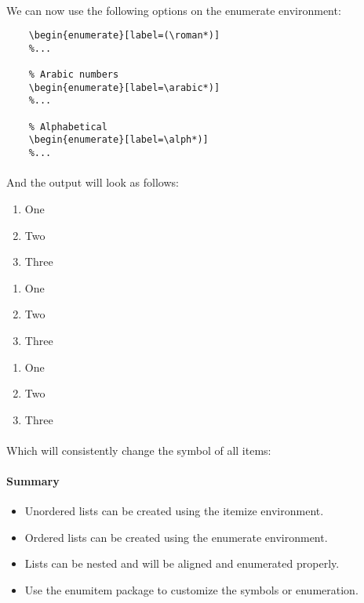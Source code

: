   \paragraph{}
  We can now use the following options on the enumerate environment:
  \begin{lstlisting}[language={[LaTeX]TeX},breaklines=true,frame=single]
    %Roman numbers
    \begin{enumerate}[label=(\roman*)]
    %...
    
    % Arabic numbers
    \begin{enumerate}[label=\arabic*)]
    %...
    
    % Alphabetical
    \begin{enumerate}[label=\alph*)]
    %...
  \end{lstlisting}
  \paragraph{}
  And the output will look as follows:
  \begin{enumerate}[label=(\roman*)]
    \item One
    \item Two
    \item Three
  \end{enumerate}
  \begin{enumerate}[label=\arabic*)]
        \item One
        \item Two
        \item Three
    \end{enumerate}
  \begin{enumerate}[label=\alph*)]
      \item One
      \item Two
      \item Three
  \end{enumerate}
  \paragraph{}
  Which will consistently change the symbol of all items:




  \paragraph{Summary}
    \begin{itemize} %
      \item Unordered lists can be created using the itemize environment.
      \item Ordered lists can be created using the enumerate environment.
      \item Lists can be nested and will be aligned and enumerated properly.
      \item Use the enumitem package to customize the symbols or enumeration.
    \end{itemize} 